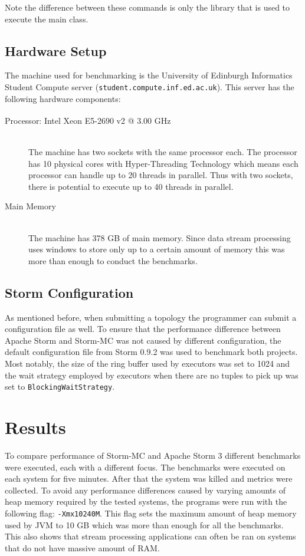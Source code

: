 \documentclass[bsc,twoside,singlespacing,normalheadings,parskip]{infthesis}\usepackage[]{graphicx}\usepackage[]{color}
\begin{document}
Note the difference between these commands is only the library that is used to execute the main class.

\subsection{Hardware Setup}

The machine used for benchmarking is the University of Edinburgh Informatics Student Compute server (\texttt{student.compute.inf.ed.ac.uk}). This server has the following hardware components:

\begin{description}
	\item[Processor: Intel\textsuperscript{\textregistered} Xeon\textsuperscript{\textregistered} E5-2690 v2 @ 3.00 GHz] \hfill \\
	The machine has two sockets with the same processor each. The processor has 10 physical cores with Hyper-Threading Technology which means each processor can handle up to 20 threads in parallel. Thus with two sockets, there is potential to execute up to 40 threads in parallel.
	\item[Main Memory] \hfill \\
	The machine has 378 GB of main memory. Since data stream processing uses windows to store only up to a certain amount of memory this was more than enough to conduct the benchmarks.
\end{description}

\subsection{Storm Configuration}

As mentioned before, when submitting a topology the programmer can submit a configuration file as well. To ensure that the performance difference between Apache Storm and Storm-MC was not caused by different configuration, the default configuration file from Storm 0.9.2 was used to benchmark both projects. Most notably, the size of the ring buffer used by executors was set to 1024 and the wait strategy employed by executors when there are no tuples to pick up was set to \texttt{BlockingWaitStrategy}.

\section{Results}
\label{sec:performance}

To compare performance of Storm-MC and Apache Storm 3 different benchmarks were executed, each with a different focus. The benchmarks were executed on each system for five minutes. After that the system was killed and metrics were collected. To avoid any performance differences caused by varying amounts of heap memory required by the tested systems, the programs were run with the following flag: \texttt{-Xmx10240M}. This flag sets the maximum amount of heap memory used by JVM to 10 GB which was more than enough for all the benchmarks. This also shows that stream processing applications can often be ran on systems that do not have massive amount of RAM.
\end{document}
